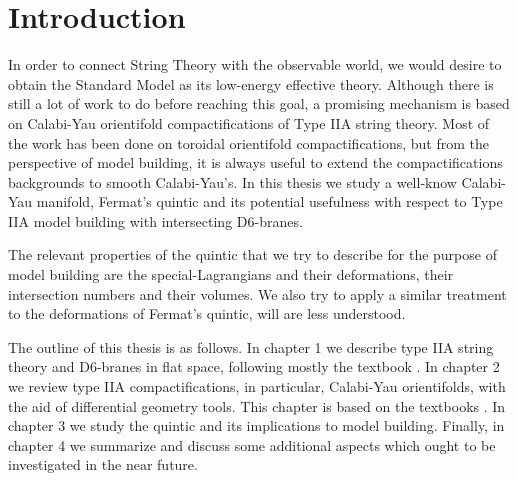 \chapter{Introduction}

In order to connect String Theory with the observable world, 
we would desire to obtain the Standard Model as its low-energy effective theory.
Although there is still a lot of work to do before reaching this goal,
a promising mechanism is based on Calabi-Yau orientifold compactifications of Type IIA string theory.
Most of the work has been done on toroidal orientifold compactifications, 
but from the perspective of model building, it is always useful to extend the compactifications backgrounds to smooth Calabi-Yau's.
In this thesis we study a well-know Calabi-Yau manifold, Fermat's quintic and
its potential usefulness with respect to Type IIA model building with intersecting D6-branes.

The relevant properties of the quintic that we try to describe for the 
purpose of model building are the special-Lagrangians and their deformations,
their intersection numbers and their volumes.
We also try to apply a similar treatment to the deformations of Fermat's quintic,
will are less understood.

The outline of this thesis is as follows.
In chapter 1 we describe type IIA string theory and D6-branes in flat space, following mostly the textbook \cite{Ibanez}. 
In chapter 2 we review type IIA compactifications, in particular, Calabi-Yau orientifolds, with the aid of differential geometry tools.
This chapter is based on the textbooks \cite{Ibanez}\cite{GSW1}\cite{GSW2}.
In chapter 3 we study the quintic and its implications to model building.
Finally, in chapter 4 we summarize and discuss some additional aspects which ought to be investigated in the near future.
